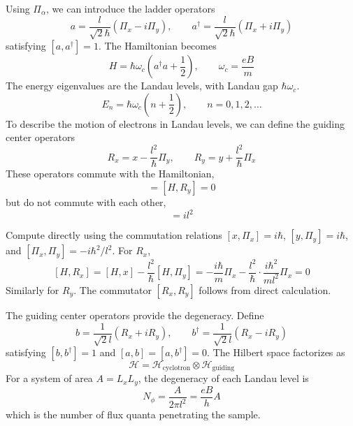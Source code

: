 \documentclass[12pt,a4paper]{article}
\begin{document}
    Using $\Pi_{\alpha}$, we can introduce the ladder operators
    \begin{equation}
        a = \frac{l}{\sqrt{2}\hbar}(\Pi_x - i\Pi_y), \qquad
        a^\dagger = \frac{l}{\sqrt{2}\hbar}(\Pi_x + i\Pi_y)
    \end{equation}
    satisfying $[a,a^\dagger] = 1$. The Hamiltonian becomes
    \begin{equation}
        H = \hbar\omega_c\left(a^\dagger a + \frac{1}{2}\right), \qquad
        \omega_c = \frac{eB}{m}
    \end{equation}
    The energy eigenvalues are the Landau levels, with Landau gap $\hbar\omega_c$.
    \begin{equation}
        E_n = \hbar\omega_c\left(n + \frac{1}{2}\right), \qquad n = 0,1,2,\ldots
    \end{equation}
    To describe the motion of electrons in Landau levels, we can define the guiding center operators
    \begin{equation}
        R_x = x - \frac{l^2}{\hbar}\Pi_y, \qquad
        R_y = y + \frac{l^2}{\hbar}\Pi_x
    \end{equation}
    These operators commute with the Hamiltonian,
    \begin{equation}
        [H, R_x] = [H, R_y] = 0
    \end{equation}
    but do not commute with each other,
    \begin{equation}
        [R_x, R_y] = i l^2
    \end{equation}
    \begin{prf}
        Compute directly using the commutation relations $[x,\Pi_x] = i\hbar$, $[y,\Pi_y] = i\hbar$, and $[\Pi_x,\Pi_y] = -i\hbar^2/l^2$. For $R_x$,
        \[ [H, R_x] = [H, x] - \frac{l^2}{\hbar}[H, \Pi_y] = -\frac{i\hbar}{m}\Pi_x - \frac{l^2}{\hbar}\cdot\frac{i\hbar^2}{m l^2}\Pi_x = 0 \]
        Similarly for $R_y$. The commutator $[R_x,R_y]$ follows from direct calculation.
    \end{prf}
    The guiding center operators provide the degeneracy. Define
    \begin{equation}
        b = \frac{1}{\sqrt{2}l}(R_x + iR_y), \qquad
        b^\dagger = \frac{1}{\sqrt{2}l}(R_x - iR_y)
    \end{equation}
    satisfying $[b,b^\dagger] = 1$ and $[a,b] = [a,b^\dagger] = 0$. The Hilbert space factorizes as
    \begin{equation}
        \mathcal{H} = \mathcal{H}_{\mathrm{cyclotron}} \otimes \mathcal{H}_{\mathrm{guiding}}
    \end{equation}
    For a system of area $A = L_xL_y$, the degeneracy of each Landau level is
    \begin{equation}
        N_\phi = \frac{A}{2\pi l^2} = \frac{eB}{h}A
    \end{equation}
    which is the number of flux quanta penetrating the sample.
\end{document}
